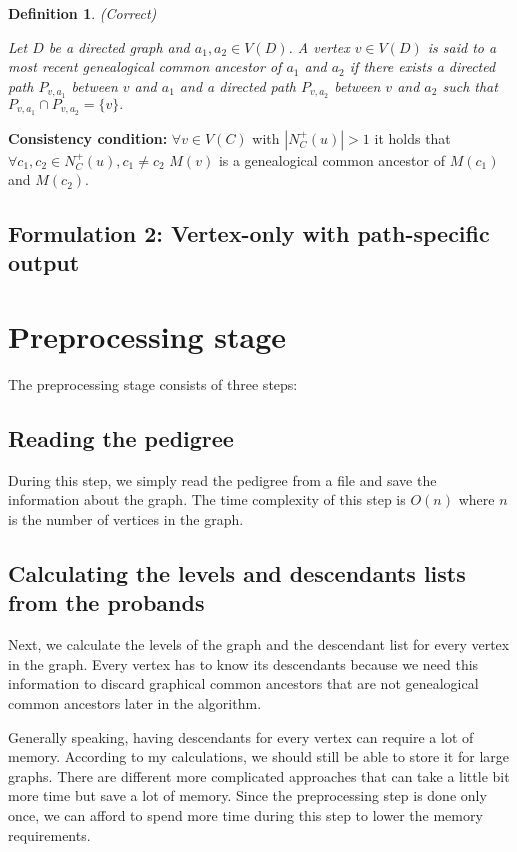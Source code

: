 \documentclass[14pt]{extarticle}
\newtheorem{definition}{Definition}
\begin{document}
\begin{definition} (Correct)
	
	Let $D$ be a directed graph and $a_1, a_2 \in V(D)$. A vertex $v \in V(D)$ is said to a most recent genealogical common ancestor of $a_1$ and $a_2$ if there exists 
	a directed path $P_{v,a_1}$ between $v$ and $a_1$ and a directed path $P_{v,a_2}$ between $v$ and $a_2$ such that $P_{v,a_1} \cap P_{v,a_2} = \{v\}.$
	
\end{definition}

\textbf{Consistency condition:}  $\forall v \in V(C)$ with $|N^{+}_C(u)| > 1$ it holds that $\forall c_1, c_2 \in N^{+}_C(u), c_1 \ne c_2$ $M(v)$ is a genealogical common ancestor of $M(c_1)$ and $M(c_2)$.


\subsection{Formulation 2: Vertex-only with path-specific output}

\section{Preprocessing stage}

The preprocessing stage consists of three steps:

\subsection{Reading the pedigree}

During this step, we simply read the pedigree from a file and save the information about the graph. The time complexity of this step is $O(n)$ where $n$ is the number of vertices in the graph.

\subsection{Calculating the levels and descendants lists from the probands}

Next, we calculate the levels of the graph and the descendant list for every vertex in the graph. Every vertex has to know its descendants because we need this information to discard graphical common ancestors that are not genealogical common ancestors later in the algorithm.

Generally speaking, having descendants for every vertex can require a lot of memory. According to my calculations, we should still be able to store it for large graphs. There are different more complicated approaches that can take a little bit more time but save a lot of memory. Since the preprocessing step is done only once, we can afford to spend more time during this step to lower the memory requirements.
\end{document}

